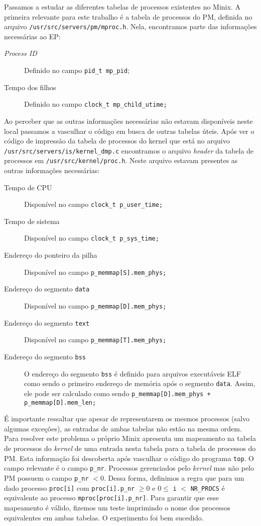 \documentclass[brazil, a4paper]{scrartcl}
\begin{document}
Passamos a estudar as diferentes tabelas de processos existentes no Minix. A
primeira relevante para este trabalho é a tabela de processos do PM, definida
no arquivo \texttt{/usr/src/servers/pm/mproc.h}. Nela, encontramos parte das
informações necessárias ao EP:

\begin{description}
	\item[\emph{Process ID}] Definido no campo \texttt{pid\_t mp\_pid};
	\item[Tempo dos filhos] Definido no campo \texttt{clock\_t mp\_child\_utime;}
\end{description}

Ao perceber que as outras informações necessárias não estavam disponíveis neste
local passamos a vasculhar o código em busca de outras tabelas úteis. Após ver o
código de impressão da tabela de processos do kernel que está no arquivo
\texttt{/usr/src/servers/is/kernel\_dmp.c} encontramos o arquivo \emph{header}
da tabela de processos em \texttt{/usr/src/kernel/proc.h}. Neste arquivo estavam
presentes as outras informações necessárias:

\begin{description}
	\item[Tempo de CPU] Disponível no campo \texttt{clock\_t p\_user\_time;}
	\item[Tempo de sistema] Disponível no campo \texttt{clock\_t p\_sys\_time;}
	\item[Endereço do ponteiro da pilha] Disponível no campo \texttt{p\_memmap[S].mem\_phys;}
	\item[Endereço do segmento \texttt{data}] Disponível no campo \texttt{p\_memmap[D].mem\_phys;}
	\item[Endereço do segmento \texttt{text}] Disponível no campo \texttt{p\_memmap[T].mem\_phys;}
	\item[Endereço do segmento \texttt{bss}] O endereço do segmento \texttt{bss} 
		é definido para arquivos executáveis ELF como sendo o primeiro endereço
		de memória após o segmento \texttt{data}. Assim, ele pode ser calculado
		como sendo \texttt{p\_memmap[D].mem\_phys + p\_memmap[D].mem\_len;}
\end{description}

É importante ressaltar que apesar de representarem os mesmos processos
(salvo algumas exceções), as
entradas de ambas tabelas não estão na mesma ordem. Para resolver este problema
o próprio Minix apresenta um mapeamento na tabela de processos do \emph{kernel}
de uma entrada nesta tabela para a tabela de processos do PM. Esta informação 
foi descoberta após vasculhar o código do programa \texttt{top}. O campo
relevante é o campo \texttt{p\_nr}. Processos gerenciados pelo \emph{kernel}
mas não pelo PM possuem o campo \texttt{p\_nr} $< 0$. Dessa forma, definimos a 
regra que para um dado processo \texttt{proc[i]} com \texttt{proc[i].p\_nr} $\ge
0$ e $0 \le$ \texttt{i} $<$ \texttt{NR\_PROCS} é equivalente ao processo
\texttt{mproc[proc[i].p\_nr]}. Para garantir que esse mapeamento é
válido, fizemos um teste imprimindo o nome dos processos equivalentes em ambas
tabelas. O experimento foi bem sucedido.
\end{document}
